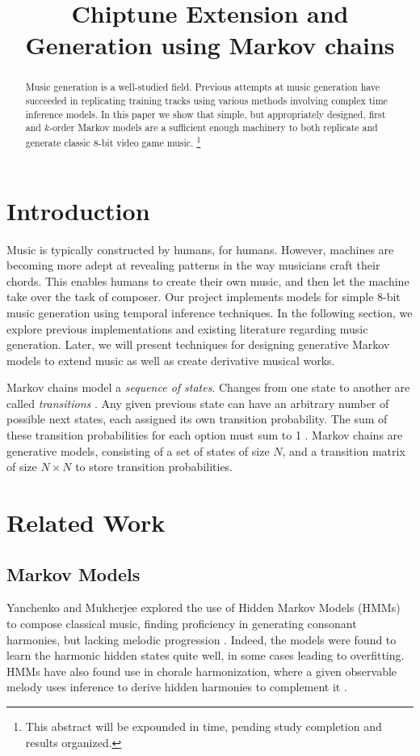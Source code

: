 \documentclass{article}
\title{Chiptune Extension and Generation using Markov chains}
\begin{document}
\maketitle

\begin{abstract}
Music generation is a well-studied field. Previous attempts at music generation have succeeded in replicating training tracks using various methods involving complex 
time inference models. In this paper we show that simple, but appropriately designed, first and $k$-order Markov models are a sufficient enough machinery to both 
replicate and generate classic 8-bit video game music. 
\footnote{This abstract will be expounded in time, pending study completion and results organized.}
\end{abstract}

\section{Introduction}
Music is typically constructed by humans, for humans. However, machines are becoming more adept at revealing patterns in the way musicians craft their chords. 
This enables humans to create their own music, and then let the machine take over the task of composer. Our project implements models for simple 8-bit music 
generation using temporal inference techniques. In the following section, we explore previous implementations and existing literature regarding music generation. 
Later, we will present techniques for designing generative Markov models to extend music as well as create derivative musical works.

Markov chains model a \emph{sequence of states}. Changes from one state to another are called \emph{transitions} \cite{markov_survey}. Any given previous state can 
have an arbitrary number of possible next states, each assigned its own transition probability. The sum of these transition probabilities for each option must sum 
to 1 \cite{markov_construct}. Markov chains are generative models, consisting of a set of states of size $N$, and a transition matrix of size $N\times N$ to store 
transition probabilities. 


\section{Related Work}
\subsection{Markov Models}
Yanchenko and Mukherjee explored the use of Hidden Markov Models (HMMs) to compose classical music, finding proficiency in generating consonant harmonies, but 
lacking melodic progression \cite{yanchenko_2017}. Indeed, the models were found to learn the harmonic hidden states quite well, in some cases leading to overfitting. 
HMMs have also found use in chorale harmonization, where a given observable melody uses inference to derive hidden harmonies to complement it \cite{allan_2005}. 
\end{document}
